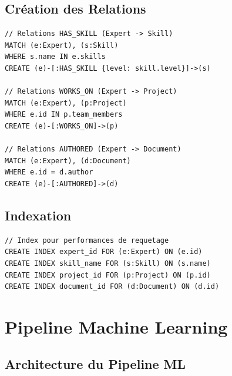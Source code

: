 \documentclass[12pt,a4paper]{article}
\begin{document}
\subsection{Création des Relations}

\begin{lstlisting}[language={}]
// Relations HAS_SKILL (Expert -> Skill)
MATCH (e:Expert), (s:Skill)
WHERE s.name IN e.skills
CREATE (e)-[:HAS_SKILL {level: skill.level}]->(s)

// Relations WORKS_ON (Expert -> Project)
MATCH (e:Expert), (p:Project)
WHERE e.id IN p.team_members
CREATE (e)-[:WORKS_ON]->(p)

// Relations AUTHORED (Expert -> Document)
MATCH (e:Expert), (d:Document)
WHERE e.id = d.author
CREATE (e)-[:AUTHORED]->(d)
\end{lstlisting}

\subsection{Indexation}

\begin{lstlisting}[language={}]
// Index pour performances de requetage
CREATE INDEX expert_id FOR (e:Expert) ON (e.id)
CREATE INDEX skill_name FOR (s:Skill) ON (s.name)
CREATE INDEX project_id FOR (p:Project) ON (p.id)
CREATE INDEX document_id FOR (d:Document) ON (d.id)
\end{lstlisting}

\section{Pipeline Machine Learning}

\subsection{Architecture du Pipeline ML}
\end{document}
